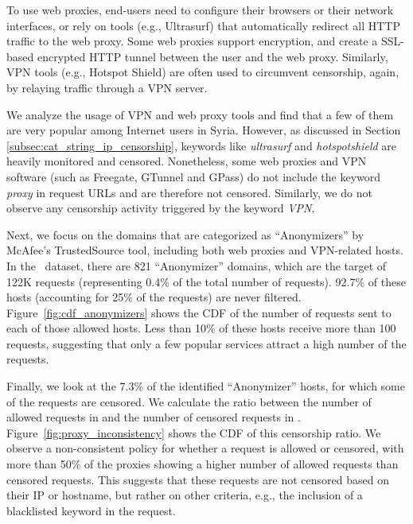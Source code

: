 \documentclass{sig-alternate-2013}
\def\df{\xspace}
\def\dd{\xspace}
\def\ds{\xspace}
\begin{document}
To use web proxies, end-users need to configure their browsers or their network interfaces, or rely on tools (e.g., Ultrasurf) that automatically redirect all HTTP traffic to the web proxy. Some web proxies support encryption, and create a SSL-based encrypted HTTP tunnel between the user and the web proxy. Similarly, VPN tools (e.g., Hotspot Shield) are often used to circumvent censorship, again, by relaying traffic through a VPN server. 

We analyze the usage of VPN and web proxy tools and find that 
a few of them are very popular among Internet users in Syria. However, as discussed in Section \ref{subsec:cat_string_ip_censorship}, keywords like {\em ultrasurf} and {\em hotspotshield} are heavily monitored and censored.
Nonetheless, some web proxies and VPN software (such as Freegate, GTunnel and GPass) do not include the keyword {\em proxy} in request URLs  and are therefore not censored. Similarly, we do not observe any censorship activity triggered by the keyword {\em VPN}. 

Next, we focus on the domains that are categorized as ``Anonymizers'' by McAfee's TrustedSource tool,  including both web proxies and VPN-related hosts.
In the \ds\ dataset, there are 821 ``Anonymizer'' domains, which are the target of 122K requests (representing 0.4\% of the total number of requests). 92.7\% of these hosts (accounting for 25\% of the requests) are never filtered. Figure~\ref{fig:cdf_anonymizers} shows the CDF of the number of requests sent to each of those allowed hosts. Less than 10\% of these hosts receive more than 100 requests, suggesting that only a few popular services attract a high number of the requests.      






Finally, we look at the 7.3\% of the identified ``Anonymizer'' hosts, for which some of the requests are censored. We calculate the ratio between the number of allowed requests in \df and the number of censored requests in \dd. Figure~\ref{fig:proxy_inconsistency} shows the CDF of this censorship ratio. We observe a  non-consistent policy for whether a request is allowed or censored, with more than 50\% of the proxies showing a higher number of allowed requests than censored requests. This suggests that these requests are not censored based on their IP or hostname, but rather on other criteria, e.g., the inclusion of a blacklisted keyword in the request.   
\end{document}
